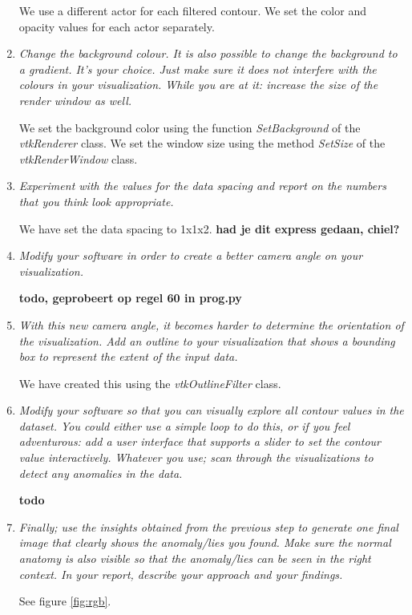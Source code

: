 \documentclass{article}[10pt]
\begin{document}
\begin{enumerate}
We use a different actor for each filtered contour. We set the color and opacity
values for each actor separately.

    \item \textit{Change the background colour. It is also possible to change
the background to a gradient. It’s your choice. Just make sure it does not
interfere with the colours in your visualization. While you are at it: increase
the size of the render window as well.}

We set the background color using the function \emph{SetBackground} of the
\emph{vtkRenderer} class. We set the window size using the method \emph{SetSize}
of the \emph{vtkRenderWindow} class.

    \item \textit{Experiment with the values for the data spacing and report on
the numbers that you think look appropriate.}

We have set the data spacing to 1x1x2. \textbf{had je dit express gedaan,
chiel?}

    \item \textit{Modify your software in order to create a better camera angle
on your visualization.}

\textbf{todo, geprobeert op regel 60 in prog.py}

    \item \textit{With this new camera angle, it becomes harder to determine the
orientation of the visualization. Add an outline to your visualization that
shows a bounding box to represent the extent of the input data.}

We have created this using the \emph{vtkOutlineFilter} class.

    \item \textit{Modify your software so that you can visually explore all
contour values in the dataset. You could either use a simple loop to do this, or
if you feel adventurous: add a user interface that supports a slider to set the
contour value interactively. Whatever you use; scan through the visualizations
to detect any anomalies in the data.}

\textbf{todo}

    \item \textit{Finally; use the insights obtained from the previous step to
generate one final image that clearly shows the anomaly/lies you found. Make
sure the normal anatomy is also visible so that the anomaly/lies can be seen in
the right context. In your report, describe your approach and your findings.}

See figure \ref{fig:rgb}.

\end{enumerate}
\end{document}
